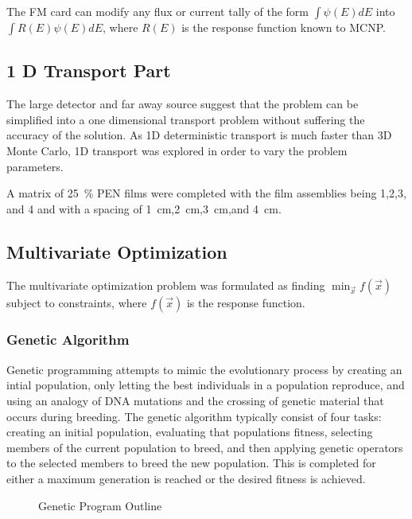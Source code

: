 The FM card can modify any flux or current tally of the form $\int \psi (E) dE$ into $\int R(E)\psi(E) dE$, where $R(E)$ is the response function known to MCNP.
\subsection{1 D Transport Part}
The large detector and far away source suggest that the problem can be simplified into a one dimensional transport problem without suffering the accuracy of the solution.
As 1D deterministic transport is much faster than 3D Monte Carlo, 1D transport was explored in order to vary the problem parameters.

A matrix of \SI{25}{\percent}  PEN films were completed with the film assemblies being 1,2,3, and 4 and with a spacing of \SI{1}{\centi\meter},\SI{2}{\centi\meter},\SI{3}{\centi\meter},and \SI{4}{\centi\meter}. 


\subsection{Multivariate Optimization}
\label{sec:MVOptimization}

The multivariate optimization problem was formulated as finding $\min_{\vec{x}} f (\vec{x})$ subject to constraints, where $f(\vec{x})$ is the response function.

\subsubsection{Genetic Algorithm}
\label{sec:GeneticAlgoMethods}
Genetic programming attempts to mimic the evolutionary process by creating an intial population, only letting the best individuals in a population reproduce, and using an analogy of DNA mutations and the crossing of genetic material that occurs during breeding.
The genetic algorithm typically consist of four tasks: creating an initial population, evaluating that populations fitness, selecting members of the current population to breed, and then applying genetic operators to the selected members to breed the new population. 
This is completed for either a maximum generation is reached or the desired fitness is achieved. 

\begin{figure}
\begin{algorithmic}
		\ENDFOR
		\ENDFOR
	\ENDWHILE
\end{algorithmic}
\caption{Genetic Program Outline}
\label{AlgoOutline}
\end{figure}

